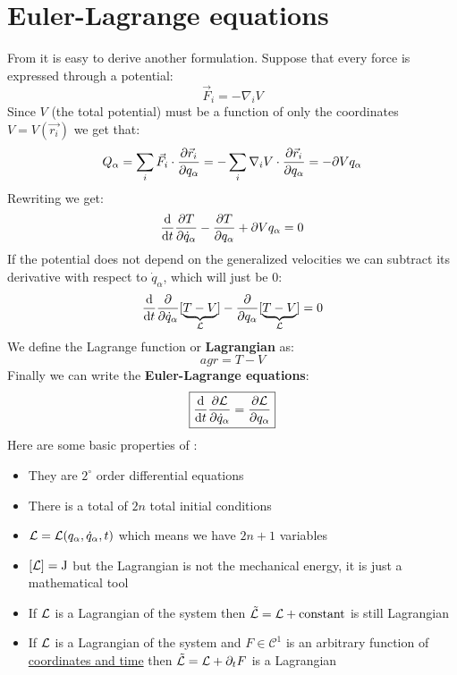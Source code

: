 \section{Euler-Lagrange equations}
From \lagrangeref\;it is easy to derive another formulation. Suppose that every force is expressed through a potential:
\begin{equation}
    \vec{F}_i = -\nabla_i V
\end{equation}
Since $V$ (the total potential) must be a function of only the coordinates $V = V(\vec{r_i})$ we get that:
\begin{equation}
    Q_{\alpha} = \displaystyle\sum_i \vec{F}_i \cdot \dfrac{\partial \vec{r}_i}{\partial q_{\alpha}} = - \displaystyle\sum_i \nabla_i V \cdot \dfrac{\partial \vec{r}_i}{\partial q_{\alpha}} = -\partial{V}{q_{\alpha}}
\end{equation}
Rewriting \lagrangeref\;we get:
\begin{equation}
    \dv{}{t}\dfrac{\partial T}{\partial \dot{q}_{\alpha}} - \dfrac{\partial T}{\partial q_{\alpha}} + \partial{V}{q_{\alpha}} = 0
\end{equation}
If the potential does not depend on the generalized velocities we can subtract its derivative with respect to $\dot{q}_{\alpha}$, which will just be 0:
\begin{equation}
    \dv{}{t}\dfrac{\partial }{\partial \dot{q}_{\alpha}}[\underbrace{T-V}_\lagr ] - \dfrac{\partial}{\partial q_{\alpha}}[\underbrace{T-V}_\lagr ] = 0
\end{equation}
We define the Lagrange function or \textbf{Lagrangian} as:
\begin{equation}
    agr  = T - V
\end{equation}
Finally we can write the \textbf{Euler-Lagrange equations}:
\begin{equation} \label{Euler_Lagrange_equations}
    \boxed{\dv{}{t}\pdv{\lagr}{\dot{q}_{\alpha}} = \pdv{\lagr}{q_{\alpha}}}
\end{equation}
Here are some basic properties of \eleref :
\begin{itemize}
    \item They are $2^\circ$ order differential equations
    \item There is a total of $2n$ total initial conditions
    \item $\mathcal{L} = \mathcal{L}(q_{\alpha},\dot{q}_{\alpha},t)$ which means we have $2n+1$ variables
    \item $[\mathcal{L}] = \mathrm{J}$ but the Lagrangian is not the mechanical energy, it is just a mathematical tool
    \item If $\mathcal{L}$ is a Lagrangian of the system then $\tilde{\mathcal{L}} = \mathcal{L} + \mathrm{constant}$ is still Lagrangian
    \item If $\mathcal{L}$ is a Lagrangian of the system and $F\in \mathcal{C}^1$ is an arbitrary function of \underline{coordinates and time} then $\tilde{\mathcal{L}} = \mathcal{L} + \partial_t F$ is a Lagrangian
\end{itemize}
